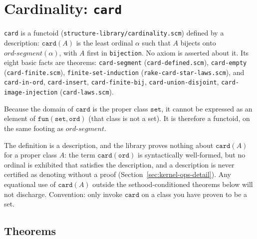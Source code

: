 
\section{Cardinality: \texttt{card}}
\label{sec:cardinality}

\texttt{card} is a functoid (\texttt{structure-library/cardinality.scm}) defined by
a description: $\mathtt{card}(A)$ is the least ordinal $\alpha$ such that
$A$ bijects onto $\mathit{ord\text{-}segment}(\alpha)$, with $A$ first in
\texttt{bijection}.  No axiom is asserted about it.  Its eight basic
facts are theorems: \texttt{card-segment} (\texttt{card-defined.scm}),
\texttt{card-empty} (\texttt{card-finite.scm}), \texttt{finite-set-induction}
(\texttt{rake-card-star-laws.scm}), and \texttt{card-in-ord},
\texttt{card-insert}, \texttt{card-finite-bij}, \texttt{card-union-disjoint},
\texttt{card-image-injection} (\texttt{card-laws.scm}).

\begin{remark}
Because the domain of $\mathtt{card}$ is the proper class $\mathtt{set}$,
it cannot be expressed as an element of $\mathtt{fun}(\mathtt{set}, \mathtt{ord})$
(that class is not a set).  It is therefore a functoid, on the same
footing as $\mathit{ord\text{-}segment}$.
\end{remark}

\begin{remark}
The definition is a description, and the library proves nothing about
$\mathtt{card}(A)$ for a proper class $A$: the term $\mathtt{card}(\mathtt{ord})$
is syntactically well-formed, but no ordinal is exhibited that satisfies the
description, and a description is never certified as denoting without a
proof (Section~\ref{sec:kernel-ops-detail}).  Any equational use of
$\mathtt{card}(A)$ outside the sethood-conditioned theorems below will
not discharge.  Convention: only invoke $\mathtt{card}$ on a class you
have proven to be a set.
\end{remark}

\subsection*{Theorems}

